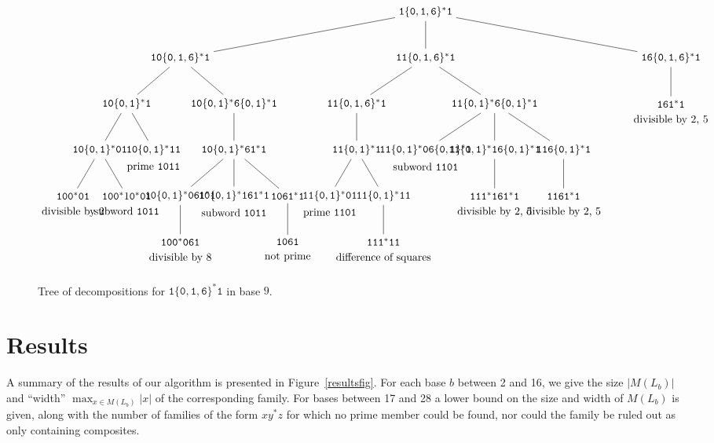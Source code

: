 \documentclass[12pt]{article}
\theoremstyle{plain}
\theoremstyle{definition}
\theoremstyle{remark}
\newcommand{\0}{\mathtt{0}}
\newcommand{\1}{\mathtt{1}}
\newcommand{\2}{\mathtt{2}}
\newcommand{\3}{\mathtt{3}}
\newcommand{\4}{\mathtt{4}}
\newcommand{\5}{\mathtt{5}}
\newcommand{\6}{\mathtt{6}}
\newcommand{\7}{\mathtt{7}}
\newcommand{\8}{\mathtt{8}}
\newcommand{\9}{\mathtt{9}}
\begin{document}
\begin{sidewaysfigure}\begin{tiny}\[ \begin{tikzpicture}
\node{$\1\{\0,\1,\6\}^*\1$}[sibling distance=8cm]
	child{node{$\1\0\{\0,\1,\6\}^*\1$}[sibling distance=3.5cm]
		child{node{$\1\0\{\0,\1\}^*\1$}[sibling distance=1.75cm]
			child{node{$\1\0\{\0,\1\}^*\0\1$}
				child{node[label=below:{divisible by 2}]{$\1\0\0^*\0\1$}}
				child{node[label=below:{subword $\1\0\1\1$}]{$\1\0\0^*1\0^*\0\1$}}}
			child{node[label=below:{prime $\1\0\1\1$}]{$\1\0\{\0,\1\}^*\1\1$}}}
		child{node{$\1\0\{\0,\1\}^*\6\{\0,\1\}^*\1$}[sibling distance=1.75cm]
			child{node{$\1\0\{\0,\1\}^*\6\1^*\1$}
				child{node{$\1\0\{\0,\1\}^*\0\6\1^*\1$}
					child{node[label=below:{divisible by 8}]{$\1\0\0^*\0\6\1$}}}
				child{node[label=below:{subword $\1\0\1\1$}]{$\1\0\{\0,\1\}^*\1\6\1^*\1$}}
				child{node{$\1\0\6\1^*\1$}
					child{node[label=below:{not prime}]{$\1\0\6\1$}}}}}}
	child{node{$\1\1\{\0,\1,\6\}^*\1$}[sibling distance=4.5cm]
		child{node{$\1\1\{\0,\1,\6\}^*\1$}[sibling distance=1.75cm]
			child{node{$\1\1\{\0,\1\}^*\1$}
				child{node[label=below:{prime $\1\1\0\1$}]{$\1\1\{\0,\1\}^*\0\1$}}
				child{node{$\1\1\{\0,\1\}^*\1\1$}
					child{node[label=below:{difference of squares}]{$\1\1\1^*\1\1$}}}}}
		child{node{$\1\1\{\0,\1\}^*\6\{\0,\1\}^*\1$}[sibling distance=2.25cm]
			child{node[label=below:{subword $\1\1\0\1$}]{$\1\1\{\0,\1\}^*\0\6\{\0,\1\}^*\1$}}
			child{node{$\1\1\{\0,\1\}^*\1\6\{\0,\1\}^*\1$}
				child{node[label=below:{divisible by 2, 5}]{$\1\1\1^*\1\6\1^*\1$}}}
			child{node{$\1\1\6\{\0,\1\}^*\1$}
				child{node[label=below:{divisible by 2, 5}]{$\1\1\6\1^*\1$}}}}}
	child{node{$\1\6\{\0,\1,\6\}^*\1$}[sibling distance=5cm]
		child{node[label=below:{divisible by 2, 5}]{$\1\6\1^*\1$}[sibling distance=3cm]}};
\end{tikzpicture} \]\end{tiny}\caption{Tree of decompositions for $\1\{\0,\1,\6\}^*\1$ in base $9$.}\label{decomptree}\end{sidewaysfigure}

\section{Results}
A summary of the results of our algorithm is presented in 
Figure~\ref{resultsfig}.
For each base $b$ between 2 and 16,
we give the size $|M(L_b)|$ and ``width'' $\max_{x \in M(L_b)} |x|$ of
the corresponding family.
For bases between 17 and 28 a lower bound on the size and width of
$M(L_b)$ is given, along with the number of families of the form
$xy^*z$ for which no prime member could be found, nor could the family be
ruled out as only containing composites.
\end{document}
